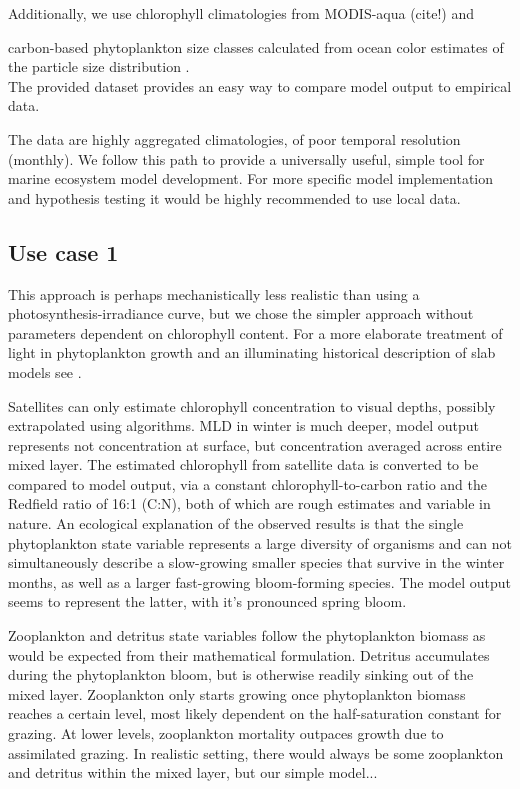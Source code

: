 \documentclass[template.tex]{subfiles}
\begin{document}
Additionally, we use chlorophyll climatologies from MODIS-aqua (cite!) and 

carbon-based phytoplankton size classes calculated from ocean color estimates of the particle size distribution \cite{Kostadinov2016Carbon-basedDistribution}.\\

The provided dataset provides an easy way to compare model output to empirical data. 

The data are highly aggregated climatologies, of poor temporal resolution (monthly). We follow this path to provide a universally useful, simple tool for marine ecosystem model development. For more specific model implementation and hypothesis testing it would be highly recommended to use local data.\\



\subsection{Use case 1}

This approach is perhaps mechanistically less realistic than using a photosynthesis-irradiance curve, but we chose the simpler approach without parameters dependent on chlorophyll content. For a more elaborate treatment of light in phytoplankton growth and an illuminating historical description of slab models see \citet{Anderson2015c}.


Satellites can only estimate chlorophyll concentration to visual depths, possibly extrapolated using algorithms. MLD in winter is much deeper, model output represents not concentration at surface, but concentration averaged across entire mixed layer.
The estimated chlorophyll from satellite data is converted to be compared to model output, via a constant chlorophyll-to-carbon ratio and the Redfield ratio of 16:1 (C:N), both of which are rough estimates and variable in nature. 
An ecological explanation of the observed results is that the single phytoplankton state variable represents a large diversity of organisms and can not simultaneously describe a slow-growing smaller species that survive in the winter months, as well as a larger fast-growing bloom-forming species. The model output seems to represent the latter, with it's pronounced spring bloom. 

Zooplankton and detritus state variables follow the phytoplankton biomass as would be expected from their mathematical formulation. Detritus accumulates during the phytoplankton bloom, but is otherwise readily sinking out of the mixed layer. Zooplankton only starts growing once phytoplankton biomass reaches a certain level, most likely dependent on the half-saturation constant for grazing. At lower levels, zooplankton mortality outpaces growth due to assimilated grazing. 
In realistic setting, there would always be some zooplankton and detritus within the mixed layer, but our simple model...
\end{document}
